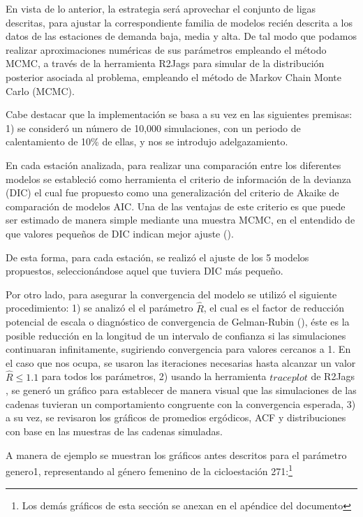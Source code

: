 \documentclass[9pt,twocolumn,twoside]{ilcss}
\begin{document}
En vista de lo anterior, la estrategia será aprovechar el conjunto de ligas descritas, para ajustar la correspondiente familia de modelos recién descrita a los datos de las estaciones de demanda baja, media y alta. De tal modo que podamos realizar aproximaciones numéricas de sus parámetros empleando el método MCMC, a través de la herramienta R2Jags para simular de la distribución posterior asociada al problema, empleando el método de Markov Chain Monte Carlo (MCMC).

Cabe destacar que la implementación se basa a su vez en las siguientes premisas: 1) se consideró un número de 10,000 simulaciones, con un periodo de calentamiento de 10\% de ellas, y nos se introdujo adelgazamiento.

En cada estación analizada, para realizar una comparación entre los diferentes modelos se estableció como herramienta el criterio de información de la devianza (DIC) el cual fue propuesto como una generalización del criterio de Akaike de comparación de modelos AIC. Una de las ventajas de este criterio es que puede ser estimado de manera simple mediante una muestra MCMC, en el entendido de que valores pequeños de DIC indican mejor ajuste (\cite{Nieto2019}).

De esta forma, para cada estación, se realizó el ajuste de los 5 modelos propuestos, seleccionándose aquel que tuviera DIC más pequeño.

Por otro lado, para asegurar la convergencia del modelo se utilizó el siguiente procedimiento: 1) se analizó el el parámetro $\hat{R}$, el cual es el factor de reducción potencial de escala o diagnóstico de convergencia de Gelman-Rubin (\cite{Gelman}), éste es la posible reducción en la longitud de un intervalo de confianza si las simulaciones continuaran infinitamente, sugiriendo convergencia para valores cercanos a 1. En el caso que nos ocupa, se usaron las iteraciones necesarias hasta alcanzar un valor $\hat{R}\leq 1.1$ para todos los parámetros, 2) usando la herramienta $traceplot$ de R2Jags , se generó un gráfico para establecer de manera visual que las simulaciones de las cadenas tuvieran un comportamiento congruente con la convergencia esperada, 3) a su vez, se revisaron los gráficos de promedios ergódicos, ACF y distribuciones con base en las muestras de las cadenas simuladas.

A manera de ejemplo se muestran los gráficos antes descritos para el parámetro genero1, representando al género femenino de la cicloestación 271:\footnote{Los demás gráficos de esta sección se anexan en el apéndice del documento}
\end{document}

